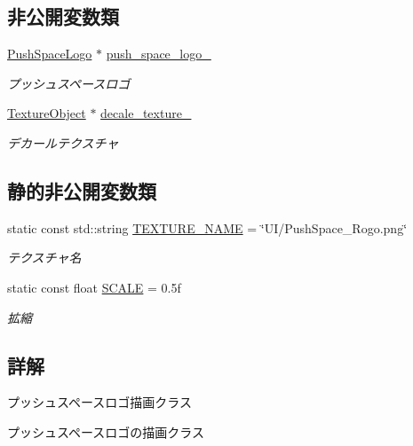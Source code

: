 \subsection*{非公開変数類}
\begin{DoxyCompactItemize}
\item 
\mbox{\hyperlink{class_push_space_logo}{Push\+Space\+Logo}} $\ast$ \mbox{\hyperlink{class_push_space_logo_draw_a3ebb51a15f132233275cfddaf3ded360}{push\+\_\+space\+\_\+logo\+\_\+}}
\begin{DoxyCompactList}\small\item\em プッシュスペースロゴ \end{DoxyCompactList}\item 
\mbox{\hyperlink{class_texture_object}{Texture\+Object}} $\ast$ \mbox{\hyperlink{class_push_space_logo_draw_a9a8c0a4328e5b38a65be20f24fab34f8}{decale\+\_\+texture\+\_\+}}
\begin{DoxyCompactList}\small\item\em デカールテクスチャ \end{DoxyCompactList}\end{DoxyCompactItemize}
\subsection*{静的非公開変数類}
\begin{DoxyCompactItemize}
\item 
static const std\+::string \mbox{\hyperlink{class_push_space_logo_draw_a74a33f8c1a9d16c3048d520a35e3b132}{T\+E\+X\+T\+U\+R\+E\+\_\+\+N\+A\+ME}} = \char`\"{}UI/Push\+Space\+\_\+\+Rogo.\+png\char`\"{}
\begin{DoxyCompactList}\small\item\em テクスチャ名 \end{DoxyCompactList}\item 
static const float \mbox{\hyperlink{class_push_space_logo_draw_a9ba8f8cd38e75d4900691645a1b0b8f3}{S\+C\+A\+LE}} = 0.\+5f
\begin{DoxyCompactList}\small\item\em 拡縮 \end{DoxyCompactList}\end{DoxyCompactItemize}


\subsection{詳解}
プッシュスペースロゴ描画クラス 

プッシュスペースロゴの描画クラス 


